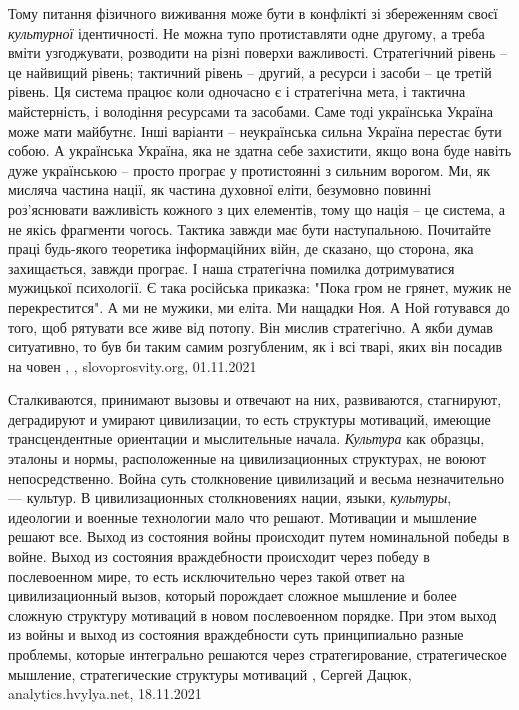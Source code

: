 Тому питання фізичного виживання може бути в конфлікті зі збереженням своєї
\emph{культурної} ідентичності. Не можна тупо протиставляти одне другому, а треба
вміти узгоджувати, розводити на різні поверхи важливості. Стратегічний рівень –
це найвищий рівень; тактичний рівень – другий, а ресурси і засоби – це третій
рівень. Ця система працює коли одночасно є і стратегічна мета, і тактична
майстерність, і володіння ресурсами та засобами. Саме тоді українська Україна
може мати майбутнє.  Інші варіанти – неукраїнська сильна Україна перестає бути
собою. А українська Україна, яка не здатна себе захистити, якщо вона буде
навіть дуже українською – просто програє у протистоянні з сильним ворогом.  Ми,
як мисляча частина нації, як частина духовної еліти, безумовно повинні
роз’яснювати важливість кожного з цих елементів, тому що нація – це система, а
не якісь фрагменти чогось.  Тактика завжди має бути наступальною. Почитайте
праці будь-якого теоретика інформаційних війн, де сказано, що сторона, яка
захищається, завжди програє. І наша стратегічна помилка дотримуватися мужицької
психології. Є така російська приказка: "Пока гром не грянет, мужик не
перекрестится". А ми не мужики, ми еліта. Ми нащадки Ноя. А Ной готувався до
того, щоб рятувати все живе від потопу. Він мислив стратегічно. А якби думав
ситуативно, то був би таким самим розгубленим, як і всі тварі, яких він посадив
на човен
, , slovoprosvity.org, 01.11.2021


Сталкиваются, принимают вызовы и отвечают на них, развиваются, стагнируют,
деградируют и умирают цивилизации, то есть структуры мотиваций, имеющие
трансцендентные ориентации и мыслительные начала.  \emph{Культура} как образцы,
эталоны и нормы, расположенные на цивилизационных структурах, не воюют
непосредственно. Война суть столкновение цивилизаций и весьма незначительно —
культур. В цивилизационных столкновениях нации, языки, \emph{культуры},
идеологии и военные технологии мало что решают. Мотивации и мышление решают
все. Выход из состояния войны происходит путем номинальной победы в войне.
Выход из состояния враждебности происходит через победу в послевоенном мире, то
есть исключительно через такой ответ на цивилизационный вызов, который
порождает сложное мышление и более сложную структуру мотиваций в новом
послевоенном порядке.  При этом выход из войны и выход из состояния
враждебности суть принципиально разные проблемы, которые интегрально решаются
через стратегирование, стратегическое мышление, стратегические структуры
мотиваций
, Сергей Дацюк, analytics.hvylya.net, 18.11.2021
